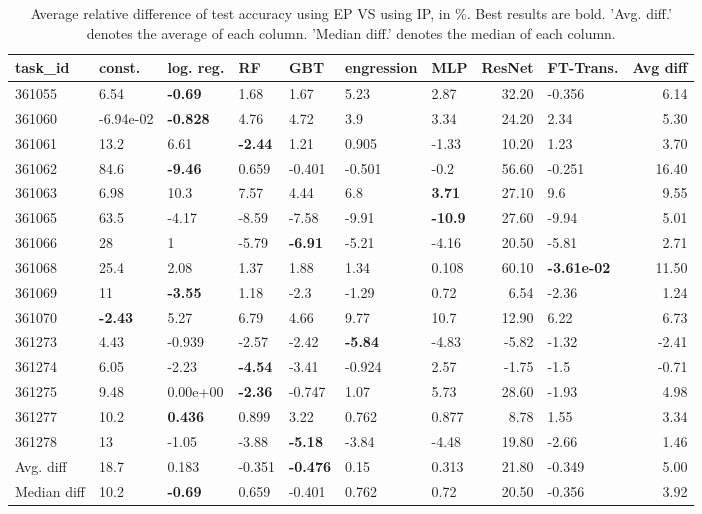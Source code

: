 \begin{table}[ht!]
\centering
\begingroup\footnotesize
\begin{tabular}{lllllllrlr}
  \hline
\hline
task\_id & const. & log. reg. & RF & GBT & engression & MLP & ResNet & FT-Trans. & Avg diff \\ 
  \hline
361055 & 6.54 & \textbf{-0.69} & 1.68 & 1.67 & 5.23 & 2.87 & 32.20 & -0.356 & 6.14 \\ 
  361060 & -6.94e-02 & \textbf{-0.828} & 4.76 & 4.72 & 3.9 & 3.34 & 24.20 & 2.34 & 5.30 \\ 
  361061 & 13.2 & 6.61 & \textbf{-2.44} & 1.21 & 0.905 & -1.33 & 10.20 & 1.23 & 3.70 \\ 
  361062 & 84.6 & \textbf{-9.46} & 0.659 & -0.401 & -0.501 & -0.2 & 56.60 & -0.251 & 16.40 \\ 
  361063 & 6.98 & 10.3 & 7.57 & 4.44 & 6.8 & \textbf{3.71} & 27.10 & 9.6 & 9.55 \\ 
  361065 & 63.5 & -4.17 & -8.59 & -7.58 & -9.91 & \textbf{-10.9} & 27.60 & -9.94 & 5.01 \\ 
  361066 & 28 & 1 & -5.79 & \textbf{-6.91} & -5.21 & -4.16 & 20.50 & -5.81 & 2.71 \\ 
  361068 & 25.4 & 2.08 & 1.37 & 1.88 & 1.34 & 0.108 & 60.10 & \textbf{-3.61e-02} & 11.50 \\ 
  361069 & 11 & \textbf{-3.55} & 1.18 & -2.3 & -1.29 & 0.72 & 6.54 & -2.36 & 1.24 \\ 
  361070 & \textbf{-2.43} & 5.27 & 6.79 & 4.66 & 9.77 & 10.7 & 12.90 & 6.22 & 6.73 \\ 
  361273 & 4.43 & -0.939 & -2.57 & -2.42 & \textbf{-5.84} & -4.83 & -5.82 & -1.32 & -2.41 \\ 
  361274 & 6.05 & -2.23 & \textbf{-4.54} & -3.41 & -0.924 & 2.57 & -1.75 & -1.5 & -0.71 \\ 
  361275 & 9.48 &  0.00e+00 & \textbf{-2.36} & -0.747 & 1.07 & 5.73 & 28.60 & -1.93 & 4.98 \\ 
  361277 & 10.2 & \textbf{0.436} & 0.899 & 3.22 & 0.762 & 0.877 & 8.78 & 1.55 & 3.34 \\ 
  361278 & 13 & -1.05 & -3.88 & \textbf{-5.18} & -3.84 & -4.48 & 19.80 & -2.66 & 1.46 \\ 
   \hline
Avg. diff & 18.7 & 0.183 & -0.351 & \textbf{-0.476} & 0.15 & 0.313 & 21.80 & -0.349 & 5.00 \\ 
  Median diff & 10.2 & \textbf{-0.69} & 0.659 & -0.401 & 0.762 & 0.72 & 20.50 & -0.356 & 3.92 \\ 
   \hline
\hline
\end{tabular}
\endgroup
\caption{Average relative difference of test accuracy using EP VS using IP, in \%. 
                  Best results are bold. 
                  'Avg. diff.' denotes the average of each column.
                  'Median diff.' denotes the median of each column.} 
\label{TABLES/table_results_accuracy_spatial_depth_only_num_features_EP_VS_IP}
\end{table}
